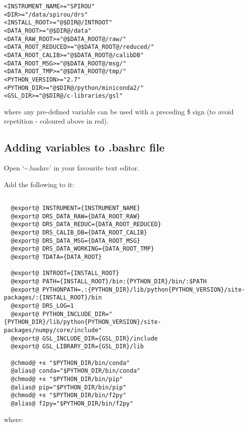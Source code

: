 \begin{lstlisting}[style=text]
<INSTRUMENT_NAME>="SPIROU"
<DIR>="/data/spirou/drs"
<INSTALL_ROOT>="@$DIR@/INTROOT"
<DATA_ROOT>="@$DIR@/data"
<DATA_RAW_ROOT>="@$DATA_ROOT@/raw/"
<DATA_ROOT_REDUCED>="@$DATA_ROOT@/reduced/"
<DATA_ROOT_CALIB>="@$DATA_ROOT@/calibDB"
<DATA_ROOT_MSG>="@$DATA_ROOT@/msg/"
<DATA_ROOT_TMP>="@$DATA_ROOT@/tmp/"
<PYTHON_VERSION>="2.7"
<PYTHON_DIR>="@$DIR@/python/miniconda2/"
<GSL_DIR>="@$DIR@/c-libraries/gsl"
\end{lstlisting}

\noindent where any pre-defined variable can be used with a preceding \$ sign (to avoid repetition - coloured above in red).


\subsection{Adding variables to .bashrc file}
\label{section:using_bashrc}

Open `\~\/.bashrc' in your favourite text editor.

Add the following to it:
\begin{lstlisting}[style=text]
    
  @export@ INSTRUMENT={INSTRUMENT_NAME}
  @export@ DRS_DATA_RAW={DATA_ROOT_RAW}
  @export@ DRS_DATA_REDUC={DATA_ROOT_REDUCED}
  @export@ DRS_CALIB_DB={DATA_ROOT_CALIB}
  @export@ DRS_DATA_MSG={DATA_ROOT_MSG}
  @export@ DRS_DATA_WORKING={DATA_ROOT_TMP}
  @export@ TDATA={DATA_ROOT}

  @export@ INTROOT={INSTALL_ROOT}
  @export@ PATH={INSTALL_ROOT}/bin:{PYTHON_DIR}/bin/:$PATH
  @export@ PYTHONPATH=.:{PYTHON_DIR}/lib/python{PYTHON_VERSION}/site-packages/:{INSTALL_ROOT}/bin
  @export@ DRS_LOG=1
  @export@ PYTHON_INCLUDE_DIR="{PYTHON_DIR}/lib/python{PYTHON_VERSION}/site-packages/numpy/core/include"
  @export@ GSL_INCLUDE_DIR={GSL_DIR}/include
  @export@ GSL_LIBRARY_DIR={GSL_DIR}/lib

  @chmod@ +x "$PYTHON_DIR/bin/conda"
  @alias@ conda="$PYTHON_DIR/bin/conda"
  @chmod@ +x "$PYTHON_DIR/bin/pip"
  @alias@ pip="$PYTHON_DIR/bin/pip"
  @chmod@ +x "$PYTHON_DIR/bin/f2py"
  @alias@ f2py="$PYTHON_DIR/bin/f2py"

\end{lstlisting}

where:

